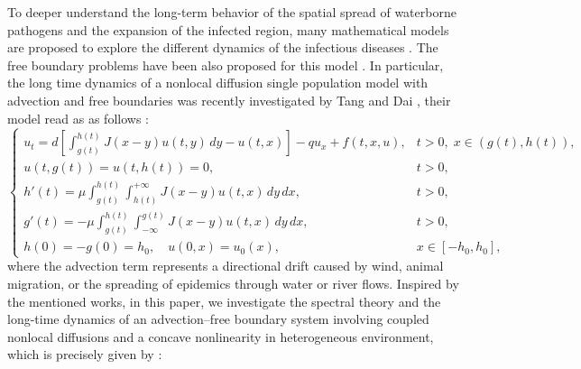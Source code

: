 \documentclass[a4paper,11pt]{amsart}
\theoremstyle{definition}
\numberwithin{equation}{section}
\theoremstyle{definition}
\begin{document}
To  deeper understand  the long-term behavior of the spatial spread of waterborne pathogens and the expansion of the infected region, many mathematical models are proposed to explore the different dynamics of the infectious diseases \cite{Bertuzzo2007, Bertuzzo2008, Bertuzzo2010, Bertuzzo2011, Bertuzzo2011, Bertuzzo2017, Chao2011, Codeco2001, Codeco2009, DuNi2020, Eisenberg2013, Eisenberg2016, Feng2016, Fitzgibbon2020, Grassly2006, Hartley2006, King2008, King_2018, Mari2012, Mukandavire2011, Mukandavire2013, Pascual2017, Righetto2011, Righetto2013, Tien2010, Tien2011, Wang2015, Weiss2016, Wu2016}. The free boundary problems have  been also proposed for this model \cite{DuNi2020,Zhao2020, Du, LiXuZhang2017, NguyenVo2022}. In particular, the long time dynamics of a nonlocal diffusion single population model with advection and free boundaries was recently investigated by Tang and Dai \cite{Tang2024a}, their model read as as follows :
 \begin{equation}\label{eq:model}
\begin{cases}
u_t = d \displaystyle \left[\int_{g(t)}^{h(t)} J(x-y)u(t,y)\,dy - u(t,x)\right]
      - q u_x + f(t,x,u),
      & t>0,\; x\in(g(t),h(t)), \\[2ex]
u(t,g(t)) = u(t,h(t)) = 0, & t>0, \\[1ex]
h'(t) = \mu \displaystyle \int_{g(t)}^{h(t)} \int_{h(t)}^{+\infty} J(x-y)u(t,x)\,dy\,dx, & t>0, \\[2ex]
g'(t) = -\mu \displaystyle \int_{g(t)}^{h(t)} \int_{-\infty}^{g(t)} J(x-y)u(t,x)\,dy\,dx, & t>0, \\[2ex]
h(0) = -g(0) = h_0, \quad u(0,x) = u_0(x), & x\in[-h_0,h_0],
\end{cases}
\end{equation}
where the advection term represents a directional drift caused by wind, animal migration, or the spreading of epidemics through water or river flows. Inspired by the mentioned works,  in this paper, we investigate the spectral theory and the long-time dynamics of an advection–free boundary system involving coupled nonlocal diffusions and a concave nonlinearity in heterogeneous environment, which is precisely given by :
\end{document}
